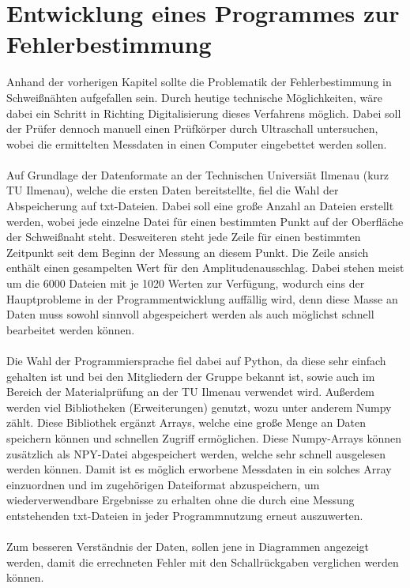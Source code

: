 \documentclass[a4paper,10pt,ngerman]{scrartcl}
\begin{document}
\section{Entwicklung eines Programmes zur Fehlerbestimmung}
Anhand der vorherigen Kapitel sollte die Problematik der Fehlerbestimmung in Schweißnähten aufgefallen sein. 
Durch heutige technische Möglichkeiten, wäre dabei ein Schritt in Richting Digitalisierung dieses Verfahrens möglich. 
Dabei soll der Prüfer dennoch manuell einen Prüfkörper durch Ultraschall untersuchen, wobei die ermittelten Messdaten 
in einen Computer eingebettet werden sollen. \\ \\
Auf Grundlage der Datenformate an der Technischen Universiät Ilmenau (kurz TU Ilmenau), welche die ersten Daten bereitstellte, fiel die Wahl der Abspeicherung auf txt-Dateien. 
Dabei soll eine große Anzahl an Dateien erstellt werden, wobei jede einzelne Datei für einen bestimmten Punkt auf der Oberfläche 
der Schweißnaht steht. Desweiteren steht jede Zeile für einen bestimmten Zeitpunkt seit dem Beginn der Messung an diesem Punkt. 
Die Zeile ansich enthält einen gesampelten Wert für den Amplitudenausschlag. Dabei stehen meist um die 6000 Dateien 
mit je 1020 Werten zur Verfügung, wodurch eins der Hauptprobleme in der Programmentwicklung auffällig wird, 
denn diese Masse an Daten muss sowohl sinnvoll abgespeichert werden als auch möglichst schnell bearbeitet werden können. \\ \\
Die Wahl der Programmiersprache fiel dabei auf Python, da diese sehr einfach gehalten ist und bei den Mitgliedern der Gruppe bekannt ist, 
sowie auch im Bereich der Materialprüfung an der TU Ilmenau verwendet wird. 
Außerdem werden viel Bibliotheken (Erweiterungen) genutzt, wozu unter anderem Numpy zählt. Diese Bibliothek ergänzt Arrays, welche 
eine große Menge an Daten speichern können und schnellen Zugriff ermöglichen. Diese Numpy-Arrays können zusätzlich als NPY-Datei abgespeichert werden, 
welche sehr schnell ausgelesen werden können. Damit ist es möglich erworbene Messdaten in ein solches Array einzuordnen und im zugehörigen 
Dateiformat abzuspeichern, um wiederverwendbare Ergebnisse zu erhalten ohne die durch eine Messung entstehenden txt-Dateien in jeder Programmnutzung erneut auszuwerten. \\ \\
Zum besseren Verständnis der Daten, sollen jene in Diagrammen angezeigt werden, damit die errechneten Fehler mit den Schallrückgaben verglichen werden können. 
\end{document}
